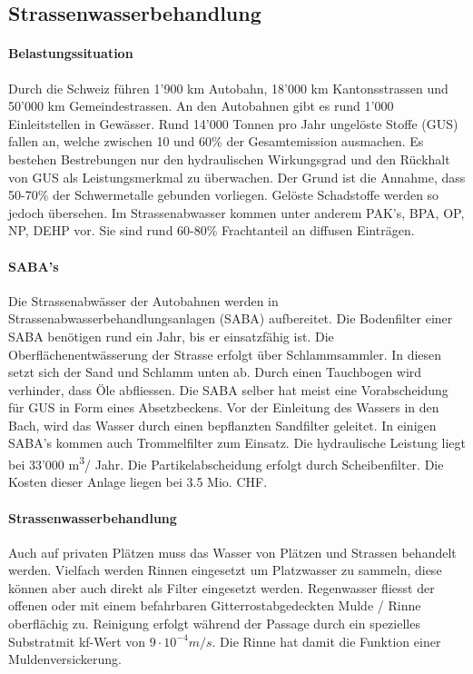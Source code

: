 \documentclass[9pt, openright=false]{scrartcl}
\begin{document}
\subsection{Strassenwasserbehandlung}
\paragraph{Belastungssituation} Durch die Schweiz führen 1'900 km Autobahn, 18'000 km Kantonsstrassen und 50'000 km Gemeindestrassen. An den Autobahnen gibt es rund 1'000 Einleitstellen in Gewässer. Rund 14'000 Tonnen pro Jahr ungelöste Stoffe (GUS) fallen an, welche zwischen 10 und 60\% der Gesamtemission ausmachen. Es bestehen Bestrebungen nur den hydraulischen Wirkungsgrad und den Rückhalt von GUS als Leistungsmerkmal zu überwachen. Der Grund ist die Annahme, dass 50-70\% der Schwermetalle gebunden vorliegen. Gelöste Schadstoffe werden so jedoch übersehen. Im Strassenabwasser kommen unter anderem PAK's, BPA, OP, NP, DEHP vor. Sie sind rund 60-80\% Frachtanteil an diffusen Einträgen. 
\paragraph{SABA's} Die Strassenabwässer der Autobahnen werden in Strassenabwasserbehandlungsanlagen (SABA) aufbereitet. Die Bodenfilter einer SABA benötigen rund ein Jahr, bis er einsatzfähig ist. Die Oberflächenentwässerung der Strasse erfolgt über Schlammsammler. In diesen setzt sich der Sand und Schlamm unten ab. Durch einen Tauchbogen wird verhinder, dass Öle abfliessen. Die SABA selber hat meist eine Vorabscheidung für GUS in Form eines Absetzbeckens. Vor der Einleitung des Wassers in den Bach, wird das Wasser durch einen bepflanzten Sandfilter geleitet. In einigen SABA's kommen auch Trommelfilter zum Einsatz. Die hydraulische Leistung liegt bei 33'000 m\textsuperscript{3}/ Jahr. Die Partikelabscheidung erfolgt durch Scheibenfilter. Die Kosten dieser Anlage liegen bei 3.5 Mio. CHF.  
\paragraph{Strassenwasserbehandlung} Auch auf privaten Plätzen muss das Wasser von Plätzen und Strassen behandelt werden. Vielfach werden Rinnen eingesetzt um Platzwasser zu sammeln, diese können aber auch direkt als Filter eingesetzt werden. Regenwasser fliesst der offenen oder mit einem befahrbaren Gitterrostabgedeckten Mulde / Rinne oberflächig zu. Reinigung erfolgt während der Passage durch ein spezielles Substratmit kf-Wert von $9 \cdot 10^{-4}m/s$. Die Rinne hat damit die Funktion einer Muldenversickerung. 
\end{document}
